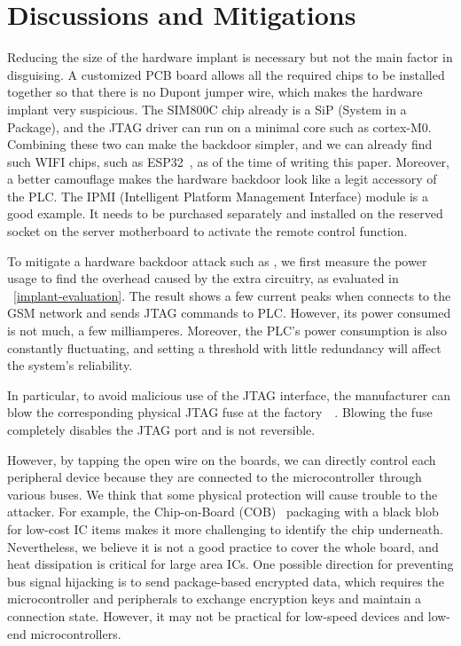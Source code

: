 \section{Discussions and Mitigations}
\label{sec:implant-discussion}

Reducing the size of the hardware implant is necessary but not the main factor in disguising. A customized PCB board allows all the required chips to be installed together so that there is no Dupont jumper wire, which makes the hardware implant very suspicious. The SIM800C chip already is a SiP (System in a Package), and the JTAG driver can run on a minimal core such as cortex-M0. Combining these two can make the backdoor simpler, and we can already find such WIFI chips, such as ESP32~\cite{pravalika2019internet}, as of the time of writing this paper. Moreover, a better camouflage makes the hardware backdoor look like a legit accessory of the PLC. The IPMI (Intelligent Platform Management Interface) module is a good example. It needs to be purchased separately and installed on the reserved socket on the server motherboard to activate the remote control function.

To mitigate a hardware backdoor attack such as \name, we first measure the power usage to find the overhead caused by the extra circuitry, as evaluated in ~\autoref{implant-evaluation}. The result shows a few current peaks when \name connects to the GSM network and sends JTAG commands to PLC. However, its power consumed is not much, a few milliamperes. Moreover, the PLC's power consumption is also constantly fluctuating, and setting a threshold with little redundancy will affect the system's reliability.

In particular, to avoid malicious use of the JTAG interface, the manufacturer can blow the corresponding physical JTAG fuse at the factory~\cite{rosenfeld2010attacks}~\cite{buskey2006protected}. Blowing the fuse completely disables the JTAG port and is not reversible.

However, by tapping the open wire on the boards, we can directly control each peripheral device because they are connected to the microcontroller through various buses. We think that some physical protection will cause trouble to the attacker. For example, the Chip-on-Board (COB)~\cite{lau1994chip} packaging with a black blob for low-cost IC items makes it more challenging to identify the chip underneath. Nevertheless, we believe it is not a good practice to cover the whole board, and heat dissipation is critical for large area ICs. One possible direction for preventing bus signal hijacking is to send package-based encrypted data, which requires the microcontroller and peripherals to exchange encryption keys and maintain a connection state. However, it may not be practical for low-speed devices and low-end microcontrollers.

